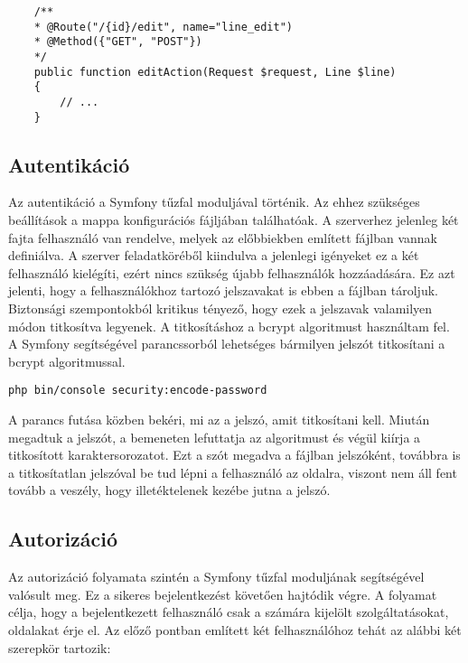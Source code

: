 \begin{lstlisting}
    /**
    * @Route("/{id}/edit", name="line_edit")
    * @Method({"GET", "POST"})
    */
    public function editAction(Request $request, Line $line)
    {
        // ...
    }
\end{lstlisting}

\subsection*{Autentikáció}
\label{authentication}

Az autentikáció a Symfony tűzfal moduljával történik. 
Az ehhez szükséges beállítások a  mappa  konfigurációs fájljában találhatóak. 
A szerverhez jelenleg két fajta felhasználó van rendelve, melyek az előbbiekben említett fájlban vannak definiálva.
A szerver feladatköréből kiindulva a jelenlegi igényeket ez a két felhasználó kielégíti, ezért nincs szükség újabb felhasználók hozzáadására. 
Ez azt jelenti, hogy a felhasználókhoz tartozó jelszavakat is ebben a fájlban tároljuk. 
Biztonsági szempontokból kritikus tényező, hogy ezek a jelszavak valamilyen módon titkosítva legyenek. 
A titkosításhoz a bcrypt algoritmust használtam fel. 
A Symfony segítségével parancssorból lehetséges bármilyen jelszót titkosítani a bcrypt algoritmussal. 

\begin{lstlisting}
php bin/console security:encode-password
\end{lstlisting}

A parancs futása közben bekéri, mi az a jelszó, amit titkosítani kell. 
Miután megadtuk a jelszót, a bemeneten lefuttatja az algoritmust és végül kiírja a titkosított karaktersorozatot. 
Ezt a szót megadva a fájlban jelszóként, továbbra is a titkosítatlan jelszóval be tud lépni a felhasználó az oldalra, viszont nem áll fent tovább a veszély, hogy illetéktelenek kezébe jutna a jelszó. 

\subsection*{Autorizáció}
\label{authorization}

Az autorizáció folyamata szintén a Symfony tűzfal moduljának segítségével valósult meg. 
Ez a sikeres bejelentkezést követően hajtódik végre. 
A folyamat célja, hogy a bejelentkezett felhasználó csak a számára kijelölt szolgáltatásokat, oldalakat érje el. 
Az előző pontban említett két felhasználóhoz tehát az alábbi két szerepkör tartozik:

